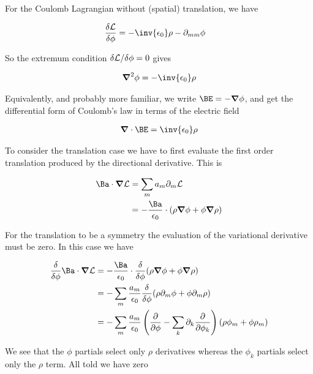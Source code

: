 For the Coulomb Lagrangian without (spatial) translation, we have

\begin{align}\label{eqn:rotationCurrents:goo4}
\frac{\delta \LL}{\delta \phi} &=
- \inv{\epsilon_0}\rho - \partial_{mm} \phi 
\end{align}

So the extremum condition ${\delta \mathcal{L}}/{\delta \phi} = 0$ gives

\begin{align}\label{eqn:rotationCurrents:goo5}
\spacegrad^2 \phi = - \inv{\epsilon_0}\rho 
\end{align}

Equivalently, and probably more familiar, we write $\BE = -\spacegrad \phi$, and get the differential form of Coulomb's law in terms of the electric field

\begin{align}\label{eqn:rotationCurrents:goo6}
\spacegrad \cdot \BE = \inv{\epsilon_0}\rho 
\end{align}

To consider the translation case we have to first evaluate the first order translation produced by the directional derivative.  This is

\begin{align*}
\Ba \cdot \spacegrad \LL 
&= \sum_m a_m \partial_m \LL \\
&= -\frac{\Ba}{\epsilon_0} \cdot (\rho \spacegrad \phi + \phi \spacegrad \rho)
\end{align*}

For the translation to be a symmetry the evaluation of the variational derivative must be zero.  In this case we have

\begin{align*}
\frac{\delta }{\delta \phi} \Ba \cdot \spacegrad \LL
&= -\frac{\Ba}{\epsilon_0} \cdot \frac{\delta }{\delta \phi} (\rho \spacegrad \phi + \phi \spacegrad \rho) \\
&= -\sum_m \frac{a_m}{\epsilon_0} \frac{\delta }{\delta \phi} (\rho \partial_m \phi + \phi \partial_m \rho) \\
&= -\sum_m \frac{a_m}{\epsilon_0} \left( \frac{\partial }{\partial \phi} - \sum_k \partial_k \frac{\partial }{\partial \phi_k}\right) (\rho \phi_m + \phi \rho_m) \\
\end{align*}

We see that the $\phi$ partials select only $\rho$ derivatives whereas the $\phi_k$ partials select only the $\rho$ term.  All told we have zero

